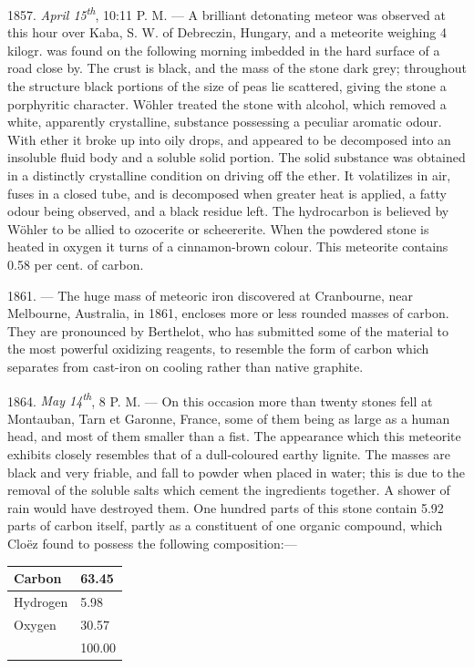 \documentclass[a4paper, 11pt, oneside, english]{article}
\begin{document}
1857. \emph{April 15\textsuperscript{th}}, 10:11 P. M. --- A brilliant detonating meteor was observed at this hour over Kaba, S. W. of Debreczin, Hungary, and a meteorite weighing 4 kilogr. was found on the following morning imbedded in the hard surface of a road close by. The crust is black, and the mass of the stone dark grey; throughout the structure black portions of the size of peas lie scattered, giving the stone a porphyritic character. Wöhler treated the stone with alcohol, which removed a white, apparently crystalline, substance possessing a peculiar aromatic odour. With ether it broke up into oily drops, and appeared to be decomposed into an insoluble fluid body and a soluble solid portion. The solid substance was obtained in a distinctly crystalline condition on driving off the ether. It volatilizes in air, fuses in a closed tube, and is decomposed when greater heat is applied, a fatty odour being observed, and a black residue left. The hydrocarbon is believed by Wöhler to be allied to ozocerite or scheererite. When the powdered stone is heated in oxygen it turns of a cinnamon-brown colour. This meteorite contains 0.58 per cent. of carbon.

1861. --- The huge mass of meteoric iron discovered at Cranbourne, near Melbourne, Australia, in 1861, encloses more or less rounded masses of carbon. They are pronounced by Berthelot, who has submitted some of the material to the most powerful oxidizing reagents, to resemble the form of carbon which separates from cast-iron on cooling rather than native graphite.

1864. \emph{May 14\textsuperscript{th}}, 8 P. M. --- On this occasion more than twenty stones fell at Montauban, Tarn et Garonne, France, some of them being as large as a human head, and most of them smaller than a fist. The appearance which this meteorite exhibits closely resembles that of a dull-coloured earthy lignite. The masses are black and very friable, and fall to powder when placed in water; this is due to the removal of the soluble salts which cement the ingredients together. A shower of rain would have destroyed them. One hundred parts of this stone contain 5.92 parts of carbon itself, partly as a constituent of one organic compound, which Cloëz found to possess the following composition:---
\begin{table}[H]
    \centering
    \begin{tabular}{|l|l|}
    \hline
        Carbon & 63.45 \\ \hline
        Hydrogen & 5.98 \\ \hline
        Oxygen & 30.57 \\ \hline
        ~ & 100.00 \\ \hline
    \end{tabular}
\end{table}
\end{document}

